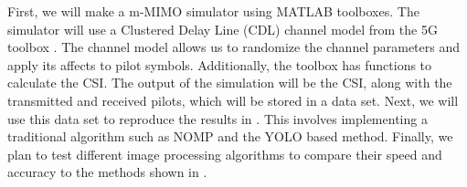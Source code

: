 First, we will make a m-MIMO simulator using MATLAB toolboxes. The simulator will use a Clustered Delay Line (CDL) channel model from the 5G toolbox \cite{matlab}. The channel model allows us to randomize the channel parameters and apply its affects to pilot symbols. Additionally, the toolbox has functions to calculate the CSI. The output of the simulation will be the CSI, along with the transmitted and received pilots, which will be stored in a data set. Next, we will use this data set to reproduce the results in \cite{Li2020}. This involves implementing a traditional algorithm such as NOMP and the YOLO based method. Finally, we plan to test different image processing algorithms to compare their speed and accuracy to the methods shown in \cite{Li2020}.
\fi